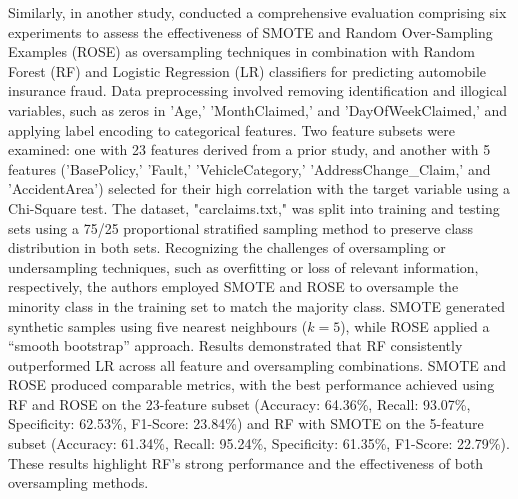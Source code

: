 \documentclass[twoside,11pt]{article}
\begin{document}
Similarly, in another study, \cite{Salmi2022} conducted a comprehensive evaluation comprising six experiments to assess the effectiveness of SMOTE and Random Over-Sampling Examples (ROSE) as oversampling techniques in combination with Random Forest (RF) and Logistic Regression (LR) classifiers for predicting automobile insurance fraud. Data preprocessing involved removing identification and illogical variables, such as zeros in 'Age,' 'MonthClaimed,' and 'DayOfWeekClaimed,' and applying label encoding to categorical features. Two feature subsets were examined: one with 23 features derived from a prior study, and another with 5 features ('BasePolicy,' 'Fault,' 'VehicleCategory,' 'AddressChange\_Claim,' and 'AccidentArea') selected for their high correlation with the target variable using a Chi-Square test. The dataset, "carclaims.txt," was split into training and testing sets using a 75/25 proportional stratified sampling method to preserve class distribution in both sets. Recognizing the challenges of oversampling or undersampling techniques, such as overfitting or loss of relevant information, respectively, the authors employed SMOTE and ROSE to oversample the minority class in the training set to match the majority class. SMOTE generated synthetic samples using five nearest neighbours (\(k = 5\)), while ROSE applied a “smooth bootstrap” approach. Results demonstrated that RF consistently outperformed LR across all feature and oversampling combinations. SMOTE and ROSE produced comparable metrics, with the best performance achieved using RF and ROSE on the 23-feature subset (Accuracy: 64.36\%, Recall: 93.07\%, Specificity: 62.53\%, F1-Score: 23.84\%) and RF with SMOTE on the 5-feature subset (Accuracy: 61.34\%, Recall: 95.24\%, Specificity: 61.35\%, F1-Score: 22.79\%). These results highlight RF's strong performance and the effectiveness of both oversampling methods.
\end{document}
